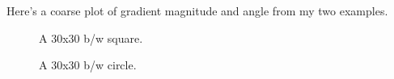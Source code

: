 \documentclass[11pt,letterpaper]{article}
\begin{document}
Here's a coarse plot of gradient magnitude and angle from my two examples.

\begin{figure}[H]
  \centering
  \begin{minipage}[b]{0.45\textwidth}
  \begin{center}
    \caption{A 30x30 b/w square.}
  \end{center}
  \end{minipage}
  \hfill
   \begin{minipage}[b]{0.45\textwidth}
   \begin{center}
    \caption{A 30x30 b/w circle.}
    \end{center}
  \end{minipage}
\end{figure}
\end{document}
